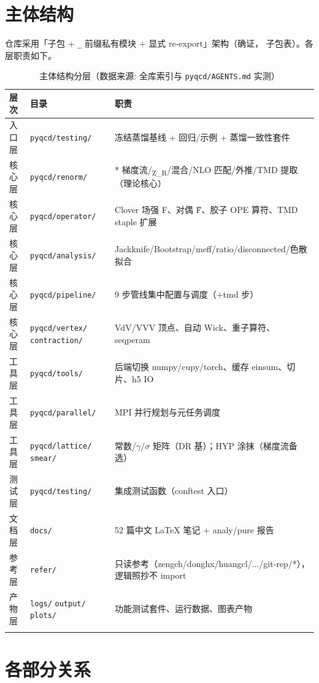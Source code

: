 \documentclass[UTF8]{ctexart}
\begin{document}
\section{主体结构}
仓库采用「子包 + \texttt{\_} 前缀私有模块 + 显式 re-export」架构（\textcolor{struct}{确证}，
\texttt{} 子包表）。各层职责如下。
\begin{xltabular}{\textwidth}{llX}
\toprule
\textcolor{struct}{层次} & 目录 & \textcolor{struct}{职责} \\
\midrule
\endhead
入口层 & \texttt{pyqcd/testing/} & 冻结蒸馏基线 + 回归/示例 + 蒸馏一致性套件 \\
核心层 & \texttt{pyqcd/renorm/} & * 梯度流/\textsubscript{Z\_R}/混合/NLO 匹配/外推/TMD 提取（理论核心） \\
核心层 & \texttt{pyqcd/operator/} & Clover 场强 F、对偶 F̃、胶子 OPE 算符、TMD staple 扩展 \\
核心层 & \texttt{pyqcd/analysis/} & Jackknife/Bootstrap/meff/ratio/disconnected/色散拟合 \\
核心层 & \texttt{pyqcd/pipeline/} & 9 步管线集中配置与调度（+tmd 步） \\
核心层 & \texttt{pyqcd/vertex/} \texttt{contraction/} & VdV/VVV 顶点、自动 Wick、重子算符、seqperam \\
工具层 & \texttt{pyqcd/tools/} & 后端切换 numpy/cupy/torch、缓存 einsum、切片、h5 IO \\
工具层 & \texttt{pyqcd/parallel/} & MPI 并行规划与元任务调度 \\
工具层 & \texttt{pyqcd/lattice/} \texttt{smear/} & 常数/$\gamma$/$\sigma$ 矩阵（DR 基）；HYP 涂抹（梯度流备选） \\
测试层 & \texttt{pyqcd/testing/} & 集成测试函数（conftest 入口） \\
文档层 & \texttt{docs/} & 52 篇中文 LaTeX 笔记 + analy/pure 报告 \\
参考层 & \texttt{refer/} & 只读参考（zengch/donghx/huangcl/.../git-rep/*），逻辑照抄不 import \\
产物层 & \texttt{logs/} \texttt{output/} \texttt{plots/} & 功能测试套件、运行数据、图表产物 \\
\bottomrule
\caption{主体结构分层（数据来源: 全库索引与 \texttt{pyqcd/AGENTS.md} 实测）}
\end{xltabular}

\section{各部分关系}
\end{document}
